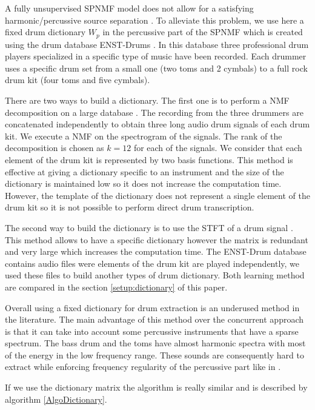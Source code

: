 \documentclass[journal]{IEEEtran}
\begin{document}
A fully unsupervised SPNMF model does not allow for a satisfying harmonic/percussive source separation \cite{laroche2015structured}. To alleviate this problem, we use here a fixed drum dictionary $W_p$ in the percussive part of the SPNMF which is created using the drum database ENST-Drums \cite{gillet2006enst}. In this database three professional drum players specialized in a specific type of music have been recorded. Each drummer uses a specific drum set from a small one (two toms and 2 cymbals) to a full rock drum kit (four toms and five cymbals). 

There are two ways to build a dictionary. The first one is to perform a NMF decomposition on a large database \cite{jaureguiberry2011adaptation}. The recording from the three drummers are concatenated independently to obtain three long audio drum signals of each drum kit. We execute a NMF on the spectrogram of the signals. The rank of the decomposition is chosen as $k=12$ for each of the signals. We consider that each element of the drum kit is represented by two basis functions. This method is effective at giving a dictionary specific to an instrument and the size of the dictionary is maintained low so it does not increase the computation time. However, the template of the dictionary does not represent a single element of the drum kit so it is not possible to perform direct drum transcription.

The second way to build the dictionary is to use the STFT of a drum signal \cite{wudrum}. This method allows to have a specific dictionary however the matrix is redundant and very large which increases the computation time. The ENST-Drum database contains audio files were elements of the drum kit are played independently, we used these files to build another types of drum dictionary. 
Both learning method are compared in the section \ref{setup:dictionary} of this paper.

Overall using a fixed dictionary for drum extraction is an underused method in the literature. The main advantage of this method over the concurrent approach is that it can take into account some percussive instruments that have a sparse spectrum. The bass drum and the toms have almost harmonic spectra with most of the energy in the low frequency range. These sounds are consequently hard to extract while enforcing frequency regularity of the percussive part like in \cite{canadas2014percussive,ono2008separation}.

If we use the dictionary matrix the algorithm is really similar and is described by algorithm \ref{AlgoDictionary}.
 
\end{document}
